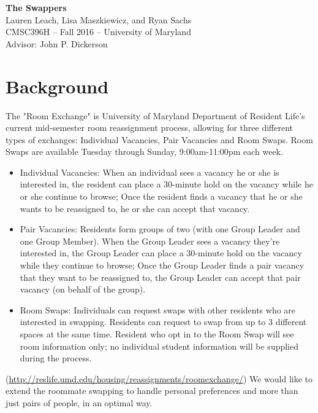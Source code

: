 \documentclass[12pt]{article}
\begin{document}
\begin{center}
{\Large \textbf{The Swappers}}\\
Lauren Leach, Lisa Maszkiewicz, and Ryan Sachs\\
CMSC396H -- Fall 2016 -- University of Maryland\\
Advisor: John P. Dickerson
\end{center}

\section*{Background}
The "Room Exchange" is University of Maryland Department of Resident Life's current mid-semester room reassignment process, allowing for three different types of exchanges: Individual Vacancies, Pair Vacancies and Room Swaps. Room Swaps are available Tuesday through Sunday, 9:00am-11:00pm each week.
\begin{itemize}
\item Individual Vacancies: When an individual sees a vacancy he or she is interested in, the resident can place a 30-minute hold on the vacancy while he or she continue to browse; Once the resident finds a vacancy that he or she wants to be reassigned to, he or she can accept that vacancy.
\item Pair Vacancies: Residents form groups of two (with one Group Leader and one Group Member). When the Group Leader sees a vacancy they're interested in, the Group Leader can place a 30-minute hold on the vacancy while they continue to browse; Once the Group Leader finds a pair vacancy that they want to be reassigned to, the Group Leader can accept that pair vacancy (on behalf of the group).
\item Room Swaps: Individuals can request swaps with other residents who are interested in swapping. Residents can request to swap from up to 3 different spaces at the same time. Resident who opt in to the Room Swap will see room information only; no individual student information will be supplied during the process.
\end{itemize}
(\url{http://reslife.umd.edu/housing/reassignments/roomexchange/})
We would like to extend the roommate swapping to handle personal preferences and more than just pairs of people, in an optimal way. 
\end{document}
